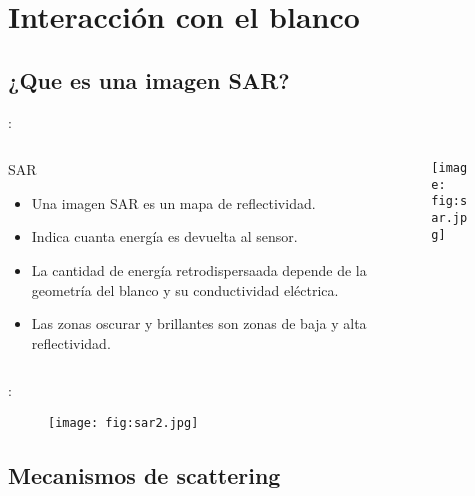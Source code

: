 \section{Interacción con el blanco}
\subsection{¿Que es una imagen SAR?}
\begin{frame}{\secname : \subsecname}
  \begin{columns}[t]
    \begin{column}{0.5\textwidth}
     \begin{block}{SAR}
       \begin{itemize}
         \item Una imagen SAR es un mapa de reflectividad.
         \item Indica cuanta energía es devuelta al sensor.
         \item La cantidad de energía retrodispersaada depende de la geometría del blanco y su conductividad eléctrica.
         \item Las zonas oscurar y brillantes son zonas de baja y alta reflectividad.
       \end{itemize}
     \end{block}
    \end{column}
    \begin{column}{0.5\textwidth}  %
        \begin{figure}
          \centering
          \texttt{[image: fig:sar.jpg]}
          \caption{}
          \label{}
        \end{figure}
    \end{column}
    \end{columns}
\end{frame}

\begin{frame}{\secname : \subsecname}
    \begin{figure}
      \centering
      \texttt{[image: fig:sar2.jpg]}
      \caption{}
      \label{}
    \end{figure}
\end{frame}

\subsection{Mecanismos de scattering}

